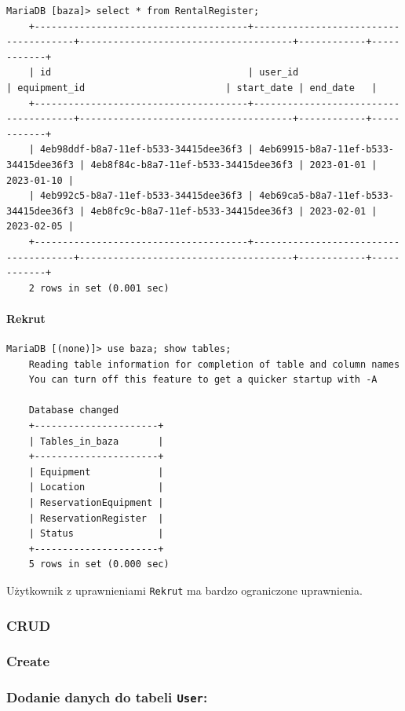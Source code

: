 \documentclass{article}
\begin{document}
\begin{verbatim}
MariaDB [baza]> select * from RentalRegister;
    +--------------------------------------+--------------------------------------+--------------------------------------+------------+------------+
    | id                                   | user_id                              | equipment_id                         | start_date | end_date   |
    +--------------------------------------+--------------------------------------+--------------------------------------+------------+------------+
    | 4eb98ddf-b8a7-11ef-b533-34415dee36f3 | 4eb69915-b8a7-11ef-b533-34415dee36f3 | 4eb8f84c-b8a7-11ef-b533-34415dee36f3 | 2023-01-01 | 2023-01-10 |
    | 4eb992c5-b8a7-11ef-b533-34415dee36f3 | 4eb69ca5-b8a7-11ef-b533-34415dee36f3 | 4eb8fc9c-b8a7-11ef-b533-34415dee36f3 | 2023-02-01 | 2023-02-05 |
    +--------------------------------------+--------------------------------------+--------------------------------------+------------+------------+
    2 rows in set (0.001 sec)
\end{verbatim}

\paragraph{Rekrut}
\begin{verbatim}
MariaDB [(none)]> use baza; show tables;
    Reading table information for completion of table and column names
    You can turn off this feature to get a quicker startup with -A
    
    Database changed
    +----------------------+
    | Tables_in_baza       |
    +----------------------+
    | Equipment            |
    | Location             |
    | ReservationEquipment |
    | ReservationRegister  |
    | Status               |
    +----------------------+
    5 rows in set (0.000 sec)
\end{verbatim}

Użytkownik z uprawnieniami \texttt{Rekrut} ma bardzo ograniczone uprawnienia.

\subsubsection{CRUD}

\subsubsection*{Create}

\subsubsection*{Dodanie danych do tabeli \texttt{User}:}
\end{document}
